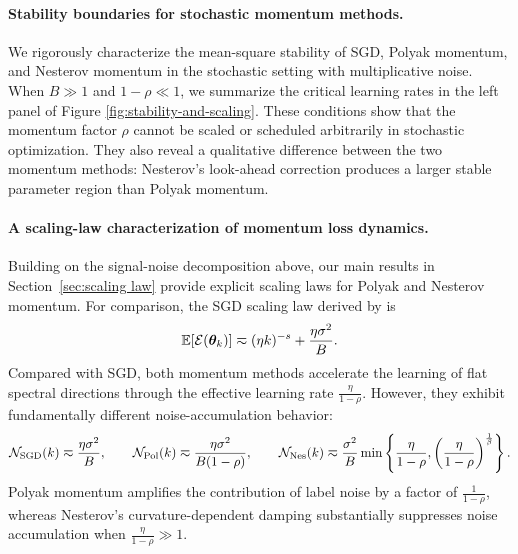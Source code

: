 \documentclass[11pt]{article}
\begin{document}
\paragraph{Stability boundaries for stochastic momentum methods.} 
We rigorously characterize the mean-square stability of SGD, Polyak momentum, and Nesterov momentum in the stochastic setting with multiplicative noise.
When \(B\gg1\) and \(1-\rho\ll1\), we summarize the critical learning rates in the left panel of Figure \ref{fig:stability-and-scaling}. These conditions show that the momentum factor \(\rho\) cannot be scaled or scheduled arbitrarily in stochastic optimization. They also reveal a qualitative difference between the two momentum methods: Nesterov's look-ahead correction produces a larger stable parameter region than Polyak momentum.

\paragraph{A scaling-law characterization of momentum loss dynamics.}
Building on the signal-noise decomposition above, our main results in Section~\ref{sec:scaling law} provide explicit scaling laws for Polyak and Nesterov momentum. For comparison, the SGD scaling law derived by \citet{li2026functional} is
\begin{equation}
\label{eq:intro-sgd-scaling-law}
\mathbb{E}[\mathcal{E}(\bm{\theta}_k)]
\eqsim
(\eta k)^{-s}
+
\frac{\eta\sigma^2}{B}.
\end{equation}
Compared with SGD, both momentum methods accelerate the learning of flat spectral directions through the effective learning rate \(\frac{\eta}{1-\rho}\). However, they exhibit fundamentally different noise-accumulation behavior: 
\[
\mathcal{N}_{\mathrm{SGD}}(k)\eqsim\frac{\eta\sigma^2}{B},\qquad
\mathcal{N}_{\mathrm{Pol}}(k)\eqsim\frac{\eta\sigma^2}{B(1-\rho)},\qquad
\mathcal{N}_{\mathrm{Nes}}(k)\eqsim\frac{\sigma^2}{B}\min\left\{\frac{\eta}{1-\rho},\left(\frac{\eta}{1-\rho}\right)^{\frac{1}{\beta}}\right\}.
\]
Polyak momentum amplifies the contribution of label noise by a factor of $\frac{1}{1-\rho}$, whereas Nesterov's curvature-dependent damping substantially 
suppresses noise accumulation when \(\frac{\eta}{1-\rho}\gg1\).
\end{document}
